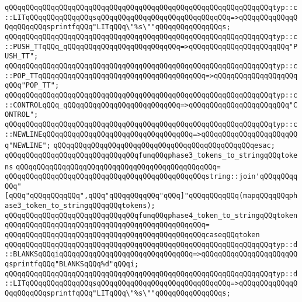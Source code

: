 \verb|qQQqqQQqqQQqqQQqqQQqqQQqqQQqqQQqqQQqqQQqqQQqqQQqqQQqqQQqqQQqqQQqtyp::c::LITqQQqqQQqqQQqqQQqsqQQqqQQqqQQqqQQqqQQqqQQqqQQqqQQq=>qQQqqQQqqQQqqQQqqQQqqQQqsprintfqQQq"LITqQQq\"%s\""qQQqqQQqqQQqqQQqs;|\newline
\verb|qQQqqQQqqQQqqQQqqQQqqQQqqQQqqQQqqQQqqQQqqQQqqQQqqQQqqQQqqQQqqQQqtyp::c::PUSH_TTqQQq_qQQqqQQqqQQqqQQqqQQqqQQqqQQq=>qQQqqQQqqQQqqQQqqQQqqQQq"PUSH_TT";|\newline
\verb|qQQqqQQqqQQqqQQqqQQqqQQqqQQqqQQqqQQqqQQqqQQqqQQqqQQqqQQqqQQqqQQqtyp::c::POP_TTqQQqqQQqqQQqqQQqqQQqqQQqqQQqqQQqqQQqqQQq=>qQQqqQQqqQQqqQQqqQQqqQQq"POP_TT";|\newline
\verb|qQQqqQQqqQQqqQQqqQQqqQQqqQQqqQQqqQQqqQQqqQQqqQQqqQQqqQQqqQQqqQQqtyp::c::CONTROLqQQq_qQQqqQQqqQQqqQQqqQQqqQQqqQQq=>qQQqqQQqqQQqqQQqqQQqqQQq"CONTROL";|\newline
\verb|qQQqqQQqqQQqqQQqqQQqqQQqqQQqqQQqqQQqqQQqqQQqqQQqqQQqqQQqqQQqqQQqtyp::c::NEWLINEqQQqqQQqqQQqqQQqqQQqqQQqqQQqqQQqqQQq=>qQQqqQQqqQQqqQQqqQQqqQQq"NEWLINE";|\newline
\verb|qQQqqQQqqQQqqQQqqQQqqQQqqQQqqQQqqQQqqQQqqQQqqQQqesac;|\newline
\newline
\verb|qQQqqQQqqQQqqQQqqQQqqQQqqQQqqQQqfunqQQqphase3_tokens_to_stringqQQqtokens|\newline
\verb|qQQqqQQqqQQqqQQqqQQqqQQqqQQqqQQqqQQqqQQqqQQqqQQq=|\newline
\verb|qQQqqQQqqQQqqQQqqQQqqQQqqQQqqQQqqQQqqQQqqQQqqQQqstring::join'qQQqqQQqqQQq"[qQQq"qQQqqQQqqQQq",qQQq"qQQqqQQqqQQq"qQQq]"qQQqqQQqqQQq(mapqQQqqQQqphase3_token_to_stringqQQqqQQqtokens);|\newline
\newline
\newline
\verb|qQQqqQQqqQQqqQQqqQQqqQQqqQQqqQQqfunqQQqphase4_token_to_stringqQQqtoken|\newline
\verb|qQQqqQQqqQQqqQQqqQQqqQQqqQQqqQQqqQQqqQQqqQQqqQQq=|\newline
\verb|qQQqqQQqqQQqqQQqqQQqqQQqqQQqqQQqqQQqqQQqqQQqqQQqcaseqQQqtoken|\newline
\verb|qQQqqQQqqQQqqQQqqQQqqQQqqQQqqQQqqQQqqQQqqQQqqQQqqQQqqQQqqQQqqQQqtyp::d::BLANKSqQQqiqQQqqQQqqQQqqQQqqQQqqQQqqQQqqQQq=>qQQqqQQqqQQqqQQqqQQqqQQqsprintfqQQq"BLANKSqQQq%d"qQQqi;|\newline
\verb|qQQqqQQqqQQqqQQqqQQqqQQqqQQqqQQqqQQqqQQqqQQqqQQqqQQqqQQqqQQqqQQqtyp::d::LITqQQqqQQqqQQqqQQqsqQQqqQQqqQQqqQQqqQQqqQQqqQQqqQQq=>qQQqqQQqqQQqqQQqqQQqqQQqsprintfqQQq"LITqQQq\"%s\""qQQqqQQqqQQqqQQqs;|\newline
